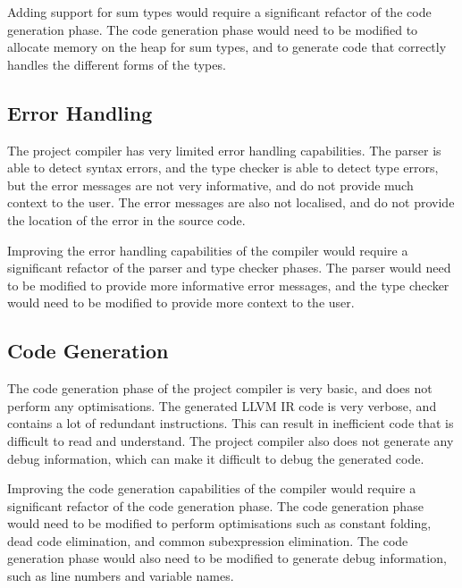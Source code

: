 Adding support for sum types would require a significant refactor of the code generation phase. The
code generation phase would need to be modified to allocate memory on the heap for sum types, and to
generate code that correctly handles the different forms of the types.

\subsection{Error Handling}

The project compiler has very limited error handling capabilities. The parser is able to detect
syntax errors, and the type checker is able to detect type errors, but the error messages are not
very informative, and do not provide much context to the user. The error messages are also not
localised, and do not provide the location of the error in the source code.

Improving the error handling capabilities of the compiler would require a significant refactor of the
parser and type checker phases. The parser would need to be modified to provide more informative
error messages, and the type checker would need to be modified to provide more context to the user.

\subsection{Code Generation}

The code generation phase of the project compiler is very basic, and does not perform any
optimisations. The generated LLVM IR code is very verbose, and contains a lot of redundant
instructions. This can result in inefficient code that is difficult to read and understand. The
project compiler also does not generate any debug information, which can make it difficult to
debug the generated code.

Improving the code generation capabilities of the compiler would require a significant refactor of
the code generation phase. The code generation phase would need to be modified to perform
optimisations such as constant folding, dead code elimination, and common subexpression elimination.
The code generation phase would also need to be modified to generate debug information, such as line
numbers and variable names.



